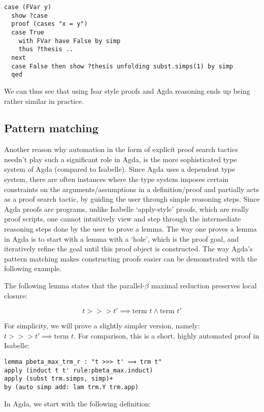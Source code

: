 \documentclass[a4paper, 12pt, twoside]{style/ociamthesis}
\begin{document}
\begin{verbatim}
case (FVar y)
  show ?case
  proof (cases "x = y")
  case True
    with FVar have False by simp
    thus ?thesis ..
  next
  case False then show ?thesis unfolding subst.simps(1) by simp
  qed
\end{verbatim}

We can thus see that using Isar style proofs and Agda reasoning ends up
being rather similar in practice.

\subsection{Pattern matching}\label{pattern-matching}

Another reason why automation in the form of explicit proof search
tactics needn't play such a significant role in Agda, is the more
sophisticated type system of Agda (compared to Isabelle). Since Agda
uses a dependent type system, there are often instances where the type
system imposes certain constraints on the arguments/assumptions in a
definition/proof and partially acts as a proof search tactic, by guiding
the user through simple reasoning steps. Since Agda proofs are programs,
unlike Isabelle `apply-style' proofs, which are really proof scripts,
one cannot intuitively view and step through the intermediate reasoning
steps done by the user to prove a lemma. The way one proves a lemma in
Agda is to start with a lemma with a `hole', which is the proof goal,
and iteratively refine the goal until this proof object is constructed.
The way Agda's pattern matching makes constructing proofs easier can be
demonstrated with the following example.

The following lemma states that the parallel-\(\beta\) maximal reduction
preserves local closure:

\[t >>> t' \implies \text{term }t \land \text{term }t'\]

For simplicity, we will prove a slightly simpler version, namely:
\(t >>> t' \implies \text{term }t\). For comparison, this is a short,
highly automated proof in Isabelle:

\begin{verbatim}
lemma pbeta_max_trm_r : "t >>> t' ⟹ trm t"
apply (induct t t' rule:pbeta_max.induct)
apply (subst trm.simps, simp)+
by (auto simp add: lam trm.Y trm.app)
\end{verbatim}

In Agda, we start with the following definition:
\end{document}

